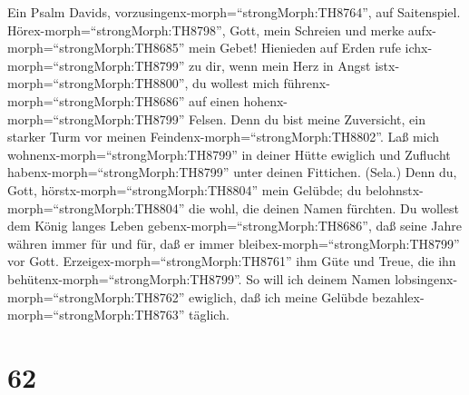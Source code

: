  Ein Psalm Davids,
vorzusingenx-morph=``strongMorph:TH8764'', auf Saitenspiel.
Hörex-morph=``strongMorph:TH8798'', Gott, mein Schreien und merke
aufx-morph=``strongMorph:TH8685'' mein Gebet!  Hienieden auf
Erden rufe ichx-morph=``strongMorph:TH8799'' zu dir, wenn mein Herz in
Angst istx-morph=``strongMorph:TH8800'', du wollest mich
führenx-morph=``strongMorph:TH8686'' auf einen
hohenx-morph=``strongMorph:TH8799'' Felsen.  Denn du bist
meine Zuversicht, ein starker Turm vor meinen
Feindenx-morph=``strongMorph:TH8802''.  Laß mich
wohnenx-morph=``strongMorph:TH8799'' in deiner Hütte ewiglich und
Zuflucht habenx-morph=``strongMorph:TH8799'' unter deinen Fittichen.
(Sela.)  Denn du, Gott, hörstx-morph=``strongMorph:TH8804''
mein Gelübde; du belohnstx-morph=``strongMorph:TH8804'' die wohl, die
deinen Namen fürchten.  Du wollest dem König langes Leben
gebenx-morph=``strongMorph:TH8686'', daß seine Jahre währen immer für
und für,  daß er immer bleibex-morph=``strongMorph:TH8799''
vor Gott. Erzeigex-morph=``strongMorph:TH8761'' ihm Güte und Treue, die
ihn behütenx-morph=``strongMorph:TH8799''.  So will ich
deinem Namen lobsingenx-morph=``strongMorph:TH8762'' ewiglich, daß ich
meine Gelübde bezahlex-morph=``strongMorph:TH8763'' täglich.

\hypertarget{section-61}{%
\section{62}\label{section-61}}

